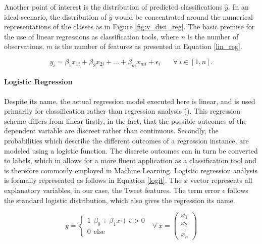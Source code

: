 		Another point of interest is the distribution of predicted classifications $\hat{y}$. In an ideal scenario, the distribution of $\hat{y}$ would be concentrated around the numerical representations of the classes as in Figure \ref{fig:y_dist_reg}. The basic premise for the use of linear regressions as classification tools, where $ n $ is the number of observations, $ m $ is the number of features as presented in Equation \ref{lin_reg}.
	
	\begin{equation}
		y_i = \beta_1 x_{1i}+ \beta_2 x_{2i} + ... + \beta_m x_{mi} + \epsilon_i \ \ \ \ \ \ \ \ 
		\forall \ i \in [1,n].
		\label{lin_reg}
	\end{equation}
	
	\paragraph{Logistic Regression} Despite its name, the actual regression model executed here is linear, and is used primarily for classification rather than regression analysis (\cite{bishop2006logistic}). This regression scheme differs from linear firstly, in the fact, that the possible outcomes of the dependent variable are discreet rather than continuous. Secondly, the probabilities which describe the different outcomes of a regression instance, are modeled using a logistic function. The discrete outcomes can in turn be converted to labels, which in allows for a more fluent application as a classification tool and is therefore commonly employed in  Machine Learning. Logistic regression analysis is formally represented as follows in Equation \ref{logit}. The $x$ vector represents all explanatory variables, in our case, the Tweet features. The term error $\epsilon$ follows the standard logistic distribution, which also gives the regression its name. 
	
	\begin{equation}
		y = 
		\begin{cases}
		1 \ \  \beta_0 + \beta_1 x + \epsilon > 0 \\
		0 \ \  \text{else } 
		\end{cases} \text{         } \forall \  x = 
		\begin{pmatrix}x_1\\x_2\\...\\x_n \end{pmatrix}
		\label{logit}
	\end{equation}